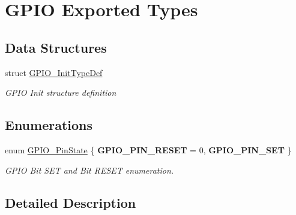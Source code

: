 \hypertarget{group___g_p_i_o___exported___types}{}\section{G\+P\+IO Exported Types}
\label{group___g_p_i_o___exported___types}
\subsection*{Data Structures}
\begin{DoxyCompactItemize}
\item 
struct \mbox{\hyperlink{struct_g_p_i_o___init_type_def}{G\+P\+I\+O\+\_\+\+Init\+Type\+Def}}
\begin{DoxyCompactList}\small\item\em G\+P\+IO Init structure definition ~\newline
 \end{DoxyCompactList}\end{DoxyCompactItemize}
\subsection*{Enumerations}
\begin{DoxyCompactItemize}
\item 
\mbox{\label{group___g_p_i_o___exported___types_ga5b3ef0486b179415581eb342e0ea6b43}} 
enum \mbox{\hyperlink{group___g_p_i_o___exported___types_ga5b3ef0486b179415581eb342e0ea6b43}{G\+P\+I\+O\+\_\+\+Pin\+State}} \{ {\bfseries G\+P\+I\+O\+\_\+\+P\+I\+N\+\_\+\+R\+E\+S\+ET} = 0, 
{\bfseries G\+P\+I\+O\+\_\+\+P\+I\+N\+\_\+\+S\+ET}
 \}
\begin{DoxyCompactList}\small\item\em G\+P\+IO Bit S\+ET and Bit R\+E\+S\+ET enumeration. \end{DoxyCompactList}\end{DoxyCompactItemize}


\subsection{Detailed Description}
